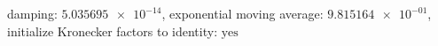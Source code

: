 damping: $\num[scientific-notation=true]{5.035695e-14}$, exponential moving average: $\num[scientific-notation=true]{9.815164e-01}$, initialize Kronecker factors to identity: $\text{yes}$